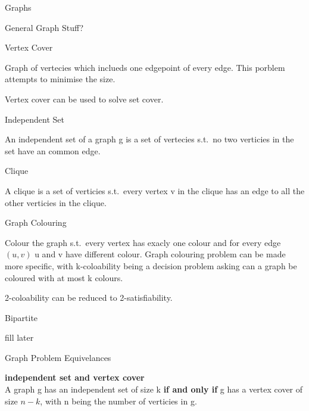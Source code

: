\documentclass[12pt, letterpaper]{article}
\begin{document}
\begin{section}{Graphs}

  \begin{subsection}{General Graph Stuff?}

    \begin{subsubsection}{Vertex Cover}

      Graph of vertecies which inclueds one edgepoint of every edge. This porblem
      attempts to minimise the size.

      Vertex cover can be used to solve set cover.

    \end{subsubsection}

    \begin{subsubsection}{Independent Set}

      An independent set of a graph g is a set of vertecies s.t.\ no two
      verticies in the set have an common edge.

    \end{subsubsection}

    \begin{subsubsection}{Clique}

      A clique is a set of verticies s.t.\ every vertex v in the clique
      has an edge to all the other verticies in the clique.

    \end{subsubsection}

    \begin{subsubsection}{Graph Colouring}

      Colour the graph s.t.\ every vertex has exacly one colour and
      for every edge \((u, v)\) u and v have different colour. Graph colouring
      problem can be made more specific, with k-coloability being a decision
      problem asking can a graph be coloured with at most k colours.

      2-coloability can be reduced to 2-satisfiability.

    \end{subsubsection}

    \begin{subsubsection}{Bipartite}

      fill later

    \end{subsubsection}

    \begin{subsubsection}{Graph Problem Equivelances}

      \textbf{independent set and vertex cover} \\
      A graph g has an independent set of size k \textbf{if and only if}
      g has a vertex cover of size \(n - k\), with n being the number of
      verticies in g.


\end{subsubsection}
\end{subsection}
\end{section}
\end{document}
